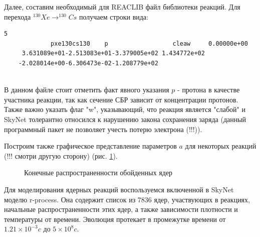 \documentclass[%
master,    %
natbib,      %
subf,        %
href,        %
colorlinks,  %
]{disser}
\begin{document}
Далее, составим необходимый для REACLIB файл библиотеки реакций. Для перехода $^{130}Xe \to ^{130}Cs$ получаем строки вида: 

\begin{lstlisting}[label={lst:label}]
	5
	         pxe130cs130    p                  cleaw     0.00000e+00          
	 3.631089e+01-2.513083e+01-3.379005e+02 1.434772e+02                      
	-2.028014e+00-6.306473e-02-1.208779e+02                                   
	
\end{lstlisting}

В данном файле стоит отметить факт явного указания $p$ - протона в качестве участника реакции, так как сечение СБР зависит от концентрации протонов. Также важно указать флаг "w", указывающий, что реакция является "слабой" и SkyNet толерантно относился к нарушению закона сохранения заряда (данный программный пакет не позволяет учесть потерю электрона (!!!)).

Построим также графическое представление параметров $a$ для некоторых реакций (!!! смотри другую сторону) (рис. \ref{ris:result-a}).

\begin{figure}[h]
	\caption{Конечные распространенности обойденных ядер}
	\label{ris:result-a}
\end{figure}

Для моделирования ядерных реакций воспользуемся включенной в SkyNet моделю r-process. Она содержит список из 7836 ядер, участвующих в реакциях, начальные распространенности этих ядер, а также зависимости плотности и температуры от времени. Эволюция протекает в промежутке времени от $1.21\times 10^{-3}c$ до $5\times 10^8c$. 
\end{document}
